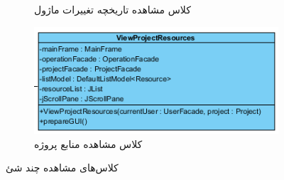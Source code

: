 \begin{figure}[H]
\begin{subfigure}[b]{0.3\textwidth}
		\caption{کلاس مشاهده تاریخچه تغییرات ماژول}
	\end{subfigure}
	\hfill
		\begin{subfigure}[b]{0.5\textwidth}
			\includegraphics[width=\textwidth]{img/class-design/ui/ViewProjectResources}
			\caption{کلاس مشاهده منابع پروژه}
		\end{subfigure}

	\caption{کلاس‌های مشاهده چند شئ}
\end{figure}

